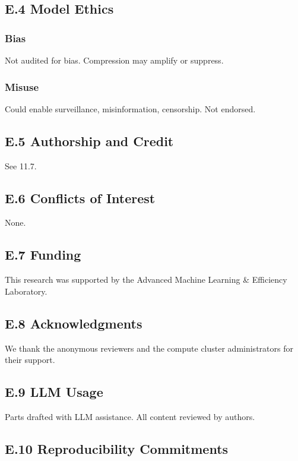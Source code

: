 \subsection{E.4 Model Ethics}

\subsubsection{Bias}

Not audited for bias. Compression may amplify or suppress.

\subsubsection{Misuse}

Could enable surveillance, misinformation, censorship. Not endorsed.

\subsection{E.5 Authorship and Credit}

See  11.7.

\subsection{E.6 Conflicts of Interest}

None.

\subsection{E.7 Funding}

This research was supported by the Advanced Machine Learning \& Efficiency Laboratory.

\subsection{E.8 Acknowledgments}

We thank the anonymous reviewers and the compute cluster administrators for their support.

\subsection{E.9 LLM Usage}

Parts drafted with LLM assistance. All content reviewed by authors.

\subsection{E.10 Reproducibility Commitments}

